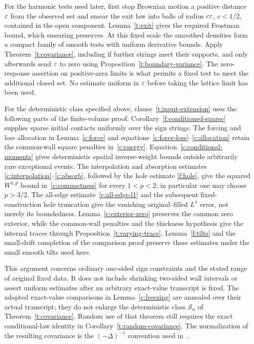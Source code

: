For the harmonic tests used later, first stop Brownian motion a positive
distance $\varepsilon$ from the observed set and smear the exit law into balls
of radius $c\varepsilon$, $c<1/2$, contained in the open component.
Lemma~\ref{t:exit} gives the required Frostman bound, which smearing
preserves.  At this fixed scale the smoothed densities form a compact
family of smooth tests with uniform derivative bounds.  Apply
Theorem~\ref{t:covariance}, including if further strings meet their
supports, and only afterwards send $\varepsilon$ to zero using
Proposition~\ref{t:boundary-variance}.  The zero-response assertion on
positive-area limits is what permits a fixed test to meet the additional
closed set.  No estimate uniform in $\varepsilon$ before taking the lattice
limit has been used.

\begin{remark}
For the deterministic class specified above, clause~\ref{t:input-extension}
uses the following parts of the finite-volume proof.
Corollary~\ref{f:conditioned-sparse} supplies sparse initial contacts
uniformly over the sign strings.  The forcing and loss allocation in
Lemma~\ref{c:force} and equations~\eqref{c:force-loss}--\eqref{c:allocation}
retain the common-wall square penalties in~\eqref{c:energy}.
Equation~\eqref{c:conditional-moments} gives deterministic spatial
inverse-weight bounds outside arbitrarily rare exceptional events.
The interpolation and absorption estimates
\eqref{c:interpolation}--\eqref{c:absorb}, followed by the hole estimate
\ref{f:hole}, give the squared $W^{1,p}$ bound in~\eqref{c:compactness}
for every $1<p<2$; in particular one may choose $p>3/2$.
The all-edge estimate~\eqref{c:all-edge-l1} and the subsequent
fixed-construction hole truncation give the vanishing original--filled
$L^1$ error, not merely its boundedness.  Lemma~\ref{c:exterior-zero}
preserves the common zero exterior, while the common-wall penalties and
the thickness hypothesis give the internal traces through
Proposition~\ref{t:varying-trace}.  Lemma~\ref{f:tilts} and the small-drift
completion of the comparison proof preserve these estimates under the
small smooth tilts used here.

This argument concerns ordinary one-sided sign constraints and the stated
range of original fixed data.  It does not include shrinking two-sided
wall intervals or assert uniform estimates after an arbitrary exact-value
transcript is fixed.  The adapted exact-value comparisons in
Lemma~\ref{c:freezing} are annealed over their actual transcript; they do
not enlarge the deterministic class $\mathcal S_n$ of
Theorem~\ref{t:covariance}.  Random use of that theorem still requires the
exact conditional-law identity in Corollary~\ref{t:random-covariance}.
The normalization of the resulting covariance is the $(-\Delta)^{-1}$
convention used in~\cite{SScontinuum}.
\end{remark}
